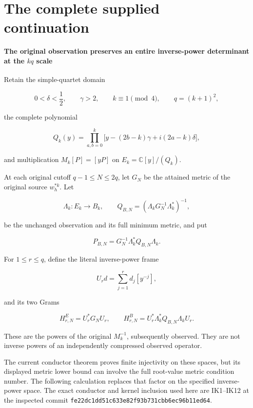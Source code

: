 \documentclass[11pt]{article}
\begin{document}
\clearpage\part{The complete supplied continuation}
\subsection{\texorpdfstring{The original observation preserves an entire inverse-power determinant at the \(kq\) scale}{The original observation preserves an entire inverse-power determinant at the kq scale}}\label{the-original-observation-preserves-an-entire-inverse-power-determinant-at-the-kq-scale}

Retain the simple-quartet domain

\[
0<\delta<\frac12,\qquad \gamma>2,\qquad k\equiv1\pmod4,
\qquad q=(k+1)^2,
\]

the complete polynomial

\[
Q_k(y)=
\prod_{a,b=0}^{k}
\bigl[y-(2b-k)\gamma+i(2a-k)\delta\bigr],
\]

and multiplication \(M_k[P]=[yP]\) on \(E_k=\mathbb C[y]/(Q_k)\).

At each original cutoff \(q-1\le N\le2q\), let \(G_N\) be the attained metric of the original source \(w_h^{*k}\). Let

\[
\Lambda_k:E_k\longrightarrow B_k,\qquad
Q_{B,N}=(\Lambda_kG_N^{-1}\Lambda_k^*)^{-1},
\]

be the unchanged observation and its full minimum metric, and put

\[
P_{B,N}=G_N^{-1}\Lambda_k^*Q_{B,N}\Lambda_k.
\]

For \(1\le r\le q\), define the literal inverse-power frame

\[
U_r d=\sum_{j=1}^{r}d_j[y^{-j}],
\]

and its two Grams

\[
H^E_{r,N}=U_r^*G_NU_r,\qquad
H^B_{r,N}=U_r^*\Lambda_k^*Q_{B,N}\Lambda_kU_r.
\tag{1}
\]

These are the powers of the original \(M_k^{-1}\), subsequently observed. They are not inverse powers of an independently compressed observed operator.

The current conductor theorem proves finite injectivity on these spaces, but its displayed metric lower bound can involve the full root-value metric condition number. The following calculation replaces that factor on the specified inverse-power space. The exact conductor and kernel inclusion used here are IK1--IK12 at the inspected commit \nolinkurl{fe22dc1dd51c633e82f93b731cbb6ec96b11ed64}.
\end{document}
